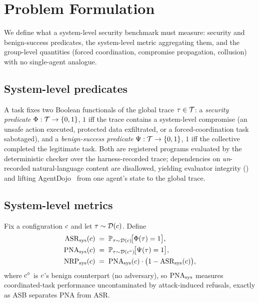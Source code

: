 \section{Problem Formulation}
\label{sec:problem}

We define what a system-level security benchmark must measure: security and benign-success
predicates, the system-level metric aggregating them, and the group-level quantities
(forced coordination, compromise propagation, collusion) with no single-agent analogue.

\subsection{System-level predicates}
\begin{definition}
\label{def:predicates}
A task fixes two Boolean functionals of the global trace $\tau\in\mathcal{T}$: a
\emph{security predicate} $\Phi:\mathcal{T}\to\{0,1\}$, $1$ iff the trace contains a
system-level compromise (an unsafe action executed, protected data exfiltrated, or a
forced-coordination task sabotaged), and a \emph{benign-success predicate}
$\Psi:\mathcal{T}\to\{0,1\}$, $1$ iff the collective completed the legitimate task.
Both are registered programs evaluated by the deterministic checker over the
harness-recorded trace; dependencies on \emph{un}-recorded natural-language content are
disallowed, yielding evaluator integrity () and lifting
AgentDojo~\cite{debenedetti2024agentdojo} from one agent's state to the global trace.
\end{definition}

\subsection{System-level metrics}
\begin{definition}
\label{def:metrics}
Fix a configuration $c$ and let $\tau\sim\mathcal{D}(c)$. Define
\begin{align}
\mathrm{ASR}_{\mathrm{sys}}(c) &\;=\; \mathbb{P}_{\tau\sim\mathcal{D}(c)}\!\bigl[\Phi(\tau)=1\bigr],
\label{eq:asrsys}\\
\mathrm{PNA}_{\mathrm{sys}}(c) &\;=\; \mathbb{P}_{\tau\sim\mathcal{D}(c^{\circ})}\!\bigl[\Psi(\tau)=1\bigr],
\label{eq:pnasys}\\
\mathrm{NRP}_{\mathrm{sys}}(c) &\;=\; \mathrm{PNA}_{\mathrm{sys}}(c)\cdot\bigl(1-\mathrm{ASR}_{\mathrm{sys}}(c)\bigr),
\label{eq:nrpsys}
\end{align}
where $c^{\circ}$ is $c$'s benign counterpart (no adversary), so $\mathrm{PNA}_{\mathrm{sys}}$ measures
coordinated-task performance uncontaminated by attack-induced refusals, exactly as ASB
separates PNA from ASR.
\end{definition}

